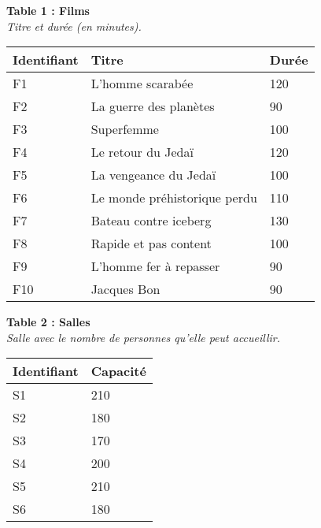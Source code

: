 \documentclass[class=report,crop=false, 12pt]{standalone}
\begin{document}
{\footnotesize
\begin{minipage}{0.6\textwidth}

\textbf{Table 1 : Films}\\
\emph{Titre et durée (en minutes).} \\

\begin{tabular}{|l|l|l|} \hline
\textbf{Identifiant} & \textbf{Titre} & \textbf{Durée} \\ \hline\hline
F1 & L'homme scarabée & 120 \\ \hline
F2 & La guerre des planètes & 90 \\ \hline
F3 & Superfemme & 100 \\ \hline
F4 & Le retour du Jedaï & 120 \\ \hline
F5 & La vengeance du Jedaï & 100 \\ \hline
F6 & Le monde préhistorique perdu & 110 \\ \hline
F7 & Bateau contre iceberg & 130 \\ \hline
F8 & Rapide et pas content & 100 \\ \hline
F9 & L'homme fer à repasser & 90 \\ \hline
F10 & Jacques Bon & 90 \\ \hline
\end{tabular}
\end{minipage}
%
%
\begin{minipage}{0.4\textwidth}

\textbf{Table 2 : Salles}\\
\emph{Salle avec le nombre de personnes qu'elle peut accueillir.} \\

\begin{tabular}{|l|l|} \hline
\textbf{Identifiant} & \textbf{Capacité} \\ \hline\hline
S1 & 210 \\ \hline
S2 & 180 \\ \hline
S3 & 170 \\ \hline
S4 & 200 \\ \hline
S5 & 210 \\ \hline
S6 & 180 \\ \hline
\end{tabular}
\end{minipage}
}
%

\bigskip
\end{document}
